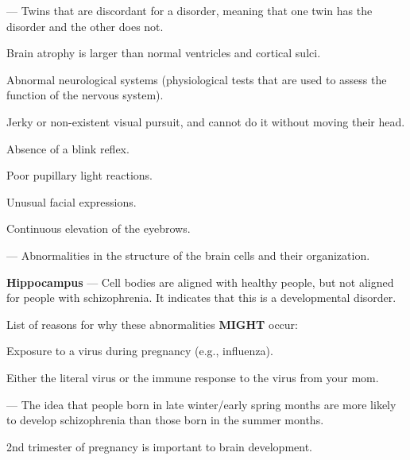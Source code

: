 \begin{coloredlist}
    \item {} — Twins that are discordant for a disorder, meaning that one twin has the disorder and the other does not. 
    \item Brain atrophy is larger than normal ventricles and cortical sulci.
    \item Abnormal neurological systems (physiological tests that are used to assess the function of the nervous system).
    \begin{coloredlist}
        \item Jerky or non-existent visual pursuit, and cannot do it without moving their head.
        \item Absence of a blink reflex.
        \item Poor pupillary light reactions.
        \item Unusual facial expressions.
        \item Continuous elevation of the eyebrows.
    \end{coloredlist}
    \item {} — Abnormalities in the structure of the brain cells and their organization.
    \begin{coloredlist}
        \item \textbf{Hippocampus} — Cell bodies are aligned with healthy people, but not aligned for people with schizophrenia. It indicates that this is a developmental disorder.
        \item List of reasons for why these abnormalities \textbf{MIGHT} occur:
        \begin{coloredlist}
            \item Exposure to a virus during pregnancy (e.g., influenza).
            \begin{coloredlist}
                \item Either the literal virus or the immune response to the virus from your mom.
                \item {} — The idea that people born in late winter/early spring months are more likely to develop schizophrenia than those born in the summer months.
                \begin{coloredlist}
                    \item 2nd trimester of pregnancy is important to brain development.
                    \begin{coloredlist}

\end{coloredlist}
\end{coloredlist}
\end{coloredlist}
\end{coloredlist}
\end{coloredlist}
\end{coloredlist}
